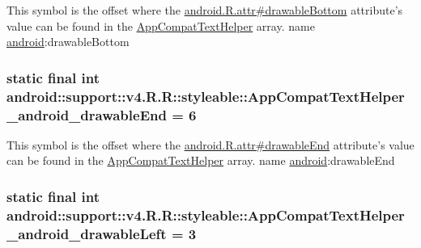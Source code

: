 This symbol is the offset where the \hyperlink{}{android.R.attr\#drawableBottom} attribute's value can be found in the \hyperlink{classandroid_1_1support_1_1v4_1_1_r_1_1styleable_4b08e16e18a4842ae56614fdc42afc26}{AppCompatTextHelper} array.  name \hyperlink{namespaceandroid}{android}:drawableBottom \hypertarget{classandroid_1_1support_1_1v4_1_1_r_1_1styleable_c2187047de5b30284c00a650592eaad5}{
\subsubsection[{AppCompatTextHelper\_\-android\_\-drawableEnd}]{\setlength{\rightskip}{0pt plus 5cm}static final int android::support::v4.R.R::styleable::AppCompatTextHelper\_\-android\_\-drawableEnd = 6}}
\label{classandroid_1_1support_1_1v4_1_1_r_1_1styleable_c2187047de5b30284c00a650592eaad5}


This symbol is the offset where the \hyperlink{}{android.R.attr\#drawableEnd} attribute's value can be found in the \hyperlink{classandroid_1_1support_1_1v4_1_1_r_1_1styleable_4b08e16e18a4842ae56614fdc42afc26}{AppCompatTextHelper} array.  name \hyperlink{namespaceandroid}{android}:drawableEnd \hypertarget{classandroid_1_1support_1_1v4_1_1_r_1_1styleable_bc3975c5c5136d1f9f02b540cab86528}{
\subsubsection[{AppCompatTextHelper\_\-android\_\-drawableLeft}]{\setlength{\rightskip}{0pt plus 5cm}static final int android::support::v4.R.R::styleable::AppCompatTextHelper\_\-android\_\-drawableLeft = 3}}
\label{classandroid_1_1support_1_1v4_1_1_r_1_1styleable_bc3975c5c5136d1f9f02b540cab86528}


